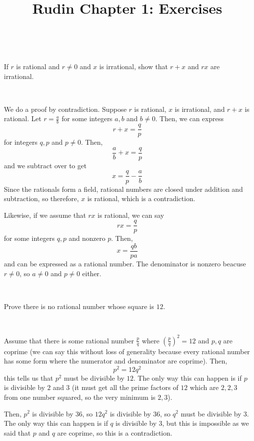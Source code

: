\documentclass{article}
\title{Rudin Chapter 1: Exercises}
\begin{document}
\maketitle

\begin{exercise}[1]
\

If $r$ is rational and $r \neq 0$ and $x$ is irrational, show that $r+x$ and $rx$ are irrational.
\end{exercise}

\begin{solution}
\

We do a proof by contradiction. Suppose $r$ is rational, $x$ is irrational, and $r+x$ is rational. Let $r = \frac{a}{b}$ for some integers $a,b$ and $b \neq 0$. Then, we can express $$r+x = \frac{q}{p}$$for integers $q,p$ and $p \neq 0$. Then, $$\frac{a}{b} + x = \frac{q}{p}$$and we subtract over to get $$x = \frac{q}{p} - \frac{a}{b}$$Since the rationals form a field, rational numbers are closed under addition and subtraction, so therefore, $x$ is rational, which is a contradiction.

Likewise, if we assume that $rx$ is rational, we can say $$rx = \frac{q}{p}$$for some integers $q,p$ and nonzero $p$. Then, $$x = \frac{qb}{pa}$$and can be expressed as a rational number. The denominator is nonzero beacuse $r \neq 0$, so $a \neq 0$ and $p \neq 0$ either.
\end{solution}

\begin{exercise}[2]
\

Prove there is no rational number whose square is $12$.
\end{exercise}

\begin{solution}
\

Assume that there is some rational number $\frac{p}{q}$ where $(\frac{p}{q})^2 = 12$ and $p, q$ are coprime (we can say this without loss of generality because every rational number has some form where the numerator and denominator are coprime). Then, $$p^2 = 12 q^2$$this tells us that $p^2$ must be divisible by $12$. The only way this can happen is if $p$ is divisible by $2$ and $3$ (it must get all the prime factors of $12$ which are $2,2,3$ from one number squared, so the very minimum is $2,3$). 

Then, $p^2$ is divisible by $36$, so $12q^2$ is divisible by $36$, so $q^2$ must be divisible by $3$. The only way this can happen is if $q$ is divisible by $3$, but this is impossible as we said that $p$ and $q$ are coprime, so this is a contradiction. 
\end{solution}
\end{document}
